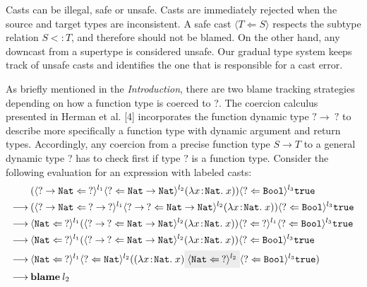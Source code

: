 Casts can be illegal, safe or unsafe. Casts are immediately rejected 
when the source and target types are inconsistent. A safe cast 
$\langle T \Leftarrow S \rangle$ respects 
the subtype relation $S <: T$, and therefore should not be blamed. 
On the other hand, any downcast from a supertype is considered unsafe. 
Our gradual type system keeps track of unsafe casts and identifies the 
one that is responsible for a cast error. 

As briefly mentioned in the \textit{Introduction}, there are two blame 
tracking strategies depending on how a function type is coerced 
to ?. The coercion calculus presented in Herman et al. [4] 
incorporates the function dynamic type $ ? \rightarrow \: ? $ 
to describe more specifically a function type with dynamic argument and return 
types. Accordingly, any coercion from a precise function type $S \rightarrow T$ 
to a general dynamic type ? has to check first if type ? 
is a function type. Consider the following evaluation for an expression 
with labeled casts:
\begin{align*}
    & (\langle ? \rightarrow \texttt{Nat} \Leftarrow 
    \: ? \rangle ^{l_1}
    \langle ? \Leftarrow 
    \texttt{Nat} \rightarrow \texttt{Nat} \rangle ^{l_2}
    (\lambda x \! : \! \texttt{Nat} . \; x)) 
    \langle ? \Leftarrow \texttt{Bool} \rangle ^{l_3} \texttt{true} \\
    \longrightarrow \:
    & (\langle ? \rightarrow \texttt{Nat} \Leftarrow 
    \: ? \rightarrow \: ? \rangle ^{l_1}
    \langle ? \rightarrow \: ? \Leftarrow 
    \texttt{Nat} \rightarrow \texttt{Nat} \rangle ^{l_2}
    (\lambda x \! : \! \texttt{Nat} . \; x)) 
    \langle ? \Leftarrow \texttt{Bool} \rangle ^{l_3} \texttt{true} \\
    \longrightarrow \:
    & \langle \texttt{Nat} \Leftarrow \: ? \rangle ^{l_1} 
    (\langle ? \rightarrow \: ? \Leftarrow 
    \texttt{Nat} \rightarrow \texttt{Nat} \rangle ^{l_2}
    (\lambda x \! : \! \texttt{Nat} . \; x))
    \langle ? \Leftarrow \: ? \rangle ^{l_1} 
    \langle ? \Leftarrow \texttt{Bool} \rangle ^{l_3} \texttt{true} \\
    \longrightarrow \:
    & \langle \texttt{Nat} \Leftarrow \: ? \rangle ^{l_1} 
    (\langle ? \rightarrow \: ? \Leftarrow 
    \texttt{Nat} \rightarrow \texttt{Nat} \rangle ^{l_2}
    (\lambda x \! : \! \texttt{Nat} . \; x)) 
    \langle ? \Leftarrow \texttt{Bool} \rangle ^{l_3} \texttt{true} \\
    \longrightarrow \: 
    & \langle \texttt{Nat} \Leftarrow \: ? \rangle ^{l_1} 
    \langle ? \Leftarrow \texttt{Nat} \rangle ^{l_2} 
    ((\lambda x \! : \! \texttt{Nat} . \; x) 
    \highlight{\langle \texttt{Nat} \Leftarrow \: ? \rangle ^{l_2}}
    \langle ? \Leftarrow \texttt{Bool} \rangle ^{l_3} \texttt{true}) \\
    \longrightarrow \:
    & \textbf{blame} \: l_2
\end{align*}
